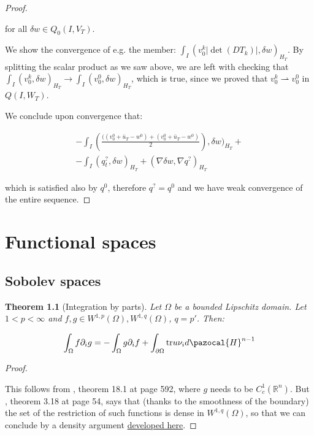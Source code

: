 \documentclass[english,a4paper,12pt,oneside]{scrbook}
\theoremstyle{break}
\newtheorem{thm}[equation]{Theorem}
\newenvironment{mproof}[1][\proofname]{%
  \begin{proof}[#1]$ $\par\nobreak\ignorespaces
}{%
  \end{proof}
}
\renewcommand*{\proofname}{Proof}
\theoremstyle{remark}
\newcommand{\mR}{\mathbb{R}}
\newcommand{\tr}{\text{tr}}
\newcommand{\weakc}{\rightharpoonup}
\begin{document}
\begin{mproof}
for all $\delta w \in Q_0(I,V_{ T})$.

We show the convergence of e.g. the member: $\int_I( v_0^k|\det(DT_k)|,\delta w)_{H_T}$. By splitting the scalar product as we saw above, we are left with checking that $\int_I (v_0^k,\delta w)_{H_T}\rightarrow  \int_I (v_0^0,\delta w)_{H_T}$, which is true, since we proved that $v_0^k \weakc v_0^0$ in $Q(I,W_T)$.

We conclude upon convergence that:

\begin{align*}
-\int_I \left (\frac{((v_0^0+\bar{u}_T - w^0)+(v_0^0+\bar{u}_T - w^0)}{2}\right ),\delta w)_{H_T}+\\
-\int_I (  q^?_t ,   \delta w )_{H_T}+ (\nabla \delta w, \nabla q^?)_{H_T}
\end{align*}

which is satisfied also by $q^0$, therefore $q^? = q^0$ and we have weak convergence of the entire sequence.

\end{mproof}

\appendix

\chapter{Functional spaces}
\section{Sobolev spaces}

\begin{thm}[Integration by parts]
\label{thm:ibp}
Let $\Omega$ be a bounded Lipschitz domain. Let $1<p<\infty$ and $f,g \in W^{1,p}(\Omega), W^{1,q}(\Omega)$, $q=p'$. Then:

$$\int_\Omega f \partial_i g = -\int_\Omega g \partial_i f+\int_{\partial \Omega} \tr u \nu_i d\pazocal{H}^{n-1}$$
\end{thm}
\begin{mproof}

This follows from \cite{leoni}, theorem 18.1 at page 592, where $g$ needs to be $C^1_c(\mR^n)$. But \cite{adams}, theorem 3.18 at page 54, says that (thanks to the smoothness of the boundary) the set of the restriction of such functions is dense in $W^{1,q}(\Omega)$, so that we can conclude by a density argument \textcolor{red}{\href{https://www.math.kit.edu/iana2/lehre/sobolevspaces2021s/media/lec15.pdf}{developed here}}.

\end{mproof}
\end{document}
